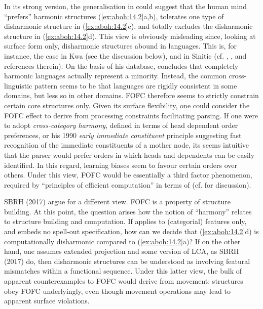\documentclass[output=paper]{langsci/langscibook}
\begin{document}
In its strong version, the generalisation in  could suggest that
the human mind \enquote{prefers} harmonic structures (\ref{ex:aboh:14.2}a,b), tolerates one type of
disharmonic structure in (\ref{ex:aboh:14.2}c), and totally excludes the disharmonic structure
in (\ref{ex:aboh:14.2}d). This view is obviously misleading since, looking at surface
form only, disharmonic structures abound in languages. This is, for instance,
the case in Kwa (see the discussion below), and in Sinitic (cf.
\citealt{HsiehSybesma2007}, \citealt{SybesmaLi2007}, \citealt{Chan2013} and
references therein). On the basis of his database, \citet{Dryer1992}
concludes that completely harmonic languages actually represent a minority.
Instead, the common cross-linguistic pattern seems to be that languages are
rigidly consistent in some domains, but less so in other domains. FOFC
therefore seems to strictly constrain certain core structures only. Given its
surface flexibility, one could consider the \gls{FOFC} effect to derive from
processing constraints facilitating parsing. If one were to adopt
 \textit{cross-category harmony}, defined in terms of head
dependent order preferences, or his 1990 \textit{early immediate constituent} principle
suggesting fast recognition of the immediate constituents of a mother node, its
seems intuitive that the parser would prefer orders in which heads and
dependents can be easily identified. In this regard, learning biases seem to
favour certain orders over others. Under this view, \gls{FOFC} would be essentially a
third factor phenomenon, required by “principles of efficient computation” in
terms of \citet{Chomsky2005} (cf. \citealt{Walkden2009} for discussion).

SBRH (2017) argue for a different view. \gls{FOFC} is a property of structure
building. At this point, the question arises how the notion of \enquote{harmony}
relates to structure building and computation. If  applies to (categorial)
features only, and embeds no spell-out specification, how can we decide that
(\ref{ex:aboh:14.2}d) is computationally disharmonic compared to (\ref{ex:aboh:14.2}a)? If on the other hand, one
assumes  extended projection and some version of
 \gls{LCA}, as SBRH (2017) do, then disharmonic structures can be
understood as involving featural mismatches within a functional sequence. Under
this latter view, the bulk of apparent counterexamples to \gls{FOFC} would derive
from movement: structures obey \gls{FOFC} underlyingly, even though movement
operations may lead to apparent surface violations.
\end{document}

